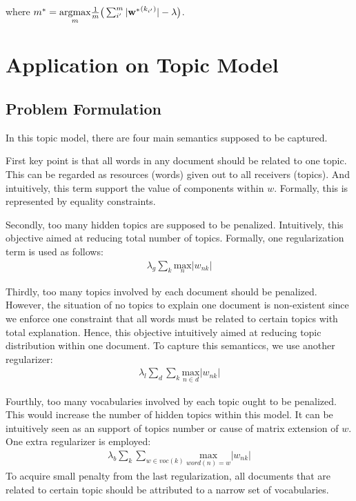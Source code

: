 \documentclass{article} %
\newcommand{\argmax}[1]{\underset{#1}{\text{argmax} }}
\newcommand{\sumk}{\sum_{k}}
\newcommand{\wnk}{w_{nk}}
\newcommand{\wopt}{\mathbf{w^{*}}}
\newcommand{\maxn}{ \underset{n}{\text{max}} }
\begin{document}
where $\ms = \argmax{m} \frac{1}{m} \big(\sum_{i'}^{m} |\wopt^{(k_{i'})}| -
\lambda \big)$.

\newpage
\section{Application on Topic Model}
\newcommand{\lambdag}{\lambda_g}
\newcommand{\lambdal}{\lambda_l}
\newcommand{\lambdab}{\lambda_b}

\newcommand{\dummyterm}{r \big| 1 - \sumk \wnk \big|}
\newcommand{\globalReg}{\lambdag \sumk \maxn |\wnk|}
\newcommand{\localReg}{\lambdal \sum_d \sum_k \underset{n \in d}{\text{max}} |\wnk|}
\newcommand{\coverReg}{\lambdab \sum_k \sum_{w \in voc(k)} \underset{word(n) = w}{\text{max}} |\wnk|  }

\subsection{Problem Formulation}
In this topic model, there are four main semantics supposed to be captured.

First key point is that all words in any document should be related to one
topic. This can be regarded as resources (words) given out to all receivers
(topics). And intuitively, this term support the value of components within
$w$. Formally, this is represented by equality constraints.

Secondly, too many hidden topics are supposed to be penalized. Intuitively,
this objective aimed at reducing total number of topics. Formally, one
regularization term is used as follows: 
\begin{align}
   \globalReg
\end{align}

Thirdly, too many topics involved by each document should be penalized.
However, the situation of no topics to explain one document is
non-existent since we enforce one constraint that all words must be related to
certain topics with total explanation.  Hence, this objective intuitively
aimed at reducing topic distribution within one document. To capture this
semanticcs, we use another regularizer:
\begin{align}
\localReg
\end{align}

Fourthly, too many vocabularies involved by each topic ought to be penalized.
This would increase the number of hidden topics within this model. It can be
intuitively seen as an support of topics number or cause of matrix extension
of $w$. One extra regularizer is employed:
\begin{align}
\coverReg
\end{align}
To acquire small penalty from the last regularization, all documents that are
related to certain topic should be attributed to a narrow set of vocabularies. 
\end{document}
